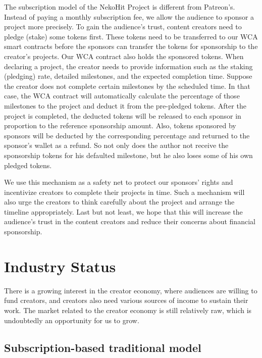 \documentclass[12pt,a4paper]{article}
\begin{document}
    The subscription model of the NekoHit Project is different from Patreon's.
    Instead of paying a monthly subscription fee, we allow the audience to sponsor
    a project more precisely.
    To gain the audience's trust, content creators need to pledge (stake) some
    tokens first.
    These tokens need to be transferred to our WCA smart contracts before the
    sponsors can transfer the tokens for sponsorship to the creator's projects.
    Our WCA contract also holds the sponsored tokens.
    When declaring a project, the creator needs to provide information such as
    the staking (pledging) rate, detailed milestones, and the expected completion
    time.
    Suppose the creator does not complete certain milestones by the scheduled time.
    In that case, the WCA contract will automatically calculate the percentage of
    those milestones to the project and deduct it from the pre-pledged tokens.
    After the project is completed, the deducted tokens will be released to each
    sponsor in proportion to the reference sponsorship amount.
    Also, tokens sponsored by sponsors will be deducted by the corresponding
    percentage and returned to the sponsor's wallet as a refund.
    So not only does the author not receive the sponsorship tokens for his defaulted
    milestone, but he also loses some of his own pledged tokens.

    We use this mechanism as a safety net to protect our sponsors' rights and
    incentivize creators to complete their projects in time.
    Such a mechanism will also urge the creators to think carefully about the
    project and arrange the timeline appropriately.
    Last but not least, we hope that this will increase the audience's trust in
    the content creators and reduce their concerns about financial sponsorship.


    \section{Industry Status}\label{sec:now}

    There is a growing interest in the creator economy, where audiences are
    willing to fund creators, and creators also need various sources of income
    to sustain their work.
    The market related to the creator economy is still relatively raw, which is
    undoubtedly an opportunity for us to grow.

    \subsection{Subscription-based traditional model}\label{subsec:tradition_patreon}
\end{document}
